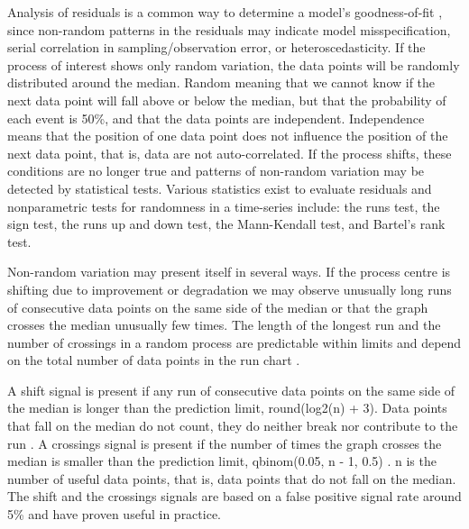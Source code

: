 Analysis of residuals is a common way to determine a model’s goodness-of-fit \citep{Cox1968general}, since  non-random patterns in the residuals may indicate model misspecification, serial correlation in sampling/observation error, or heteroscedasticity.  If the process of interest shows only random variation, the data points will be randomly distributed around the median. Random meaning that we cannot know if the next data point will fall above or below the median, but that the probability of each event is 50\%, and that the data points are independent. Independence means that the position of one data point does not influence the position of the next data point, that is, data are not auto-correlated. If the process shifts, these conditions are no longer true and patterns of non-random variation may be detected by statistical tests. Various statistics exist to evaluate residuals and nonparametric tests for randomness in a time-series include: the runs test, the sign test, the runs up and down test, the Mann-Kendall test, and Bartel’s rank test.

Non-random variation may present itself in several ways. If the process centre is shifting due to improvement or degradation we may observe unusually long runs of consecutive data points on the same side of the median or that the graph crosses the median unusually few times. The length of the longest run and the number of crossings in a random process are predictable within limits and depend on the total number of data points in the run chart \citep{anhoj2015diagnostic}.

A shift signal is present if any run of consecutive data points on the same side of the median is longer than the prediction limit, round(log2(n) + 3). Data points that fall on the median do not count, they do neither break nor contribute to the run \cite{schilling2012surprising}. A crossings signal is present if the number of times the graph crosses the median is smaller than the prediction limit, qbinom(0.05, n - 1, 0.5) \citep{chen2010impacts}. n is the number of useful data points, that is, data points that do not fall on the median. The shift and the crossings signals are based on a false positive signal rate around 5\% and have proven useful in practice.